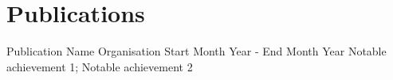 \section*{Publications}

\componentlist
    {Publication Name}
    {Organisation}
    {Start Month Year - End Month Year}
    {
        Notable achievement 1;
        Notable achievement 2
    }